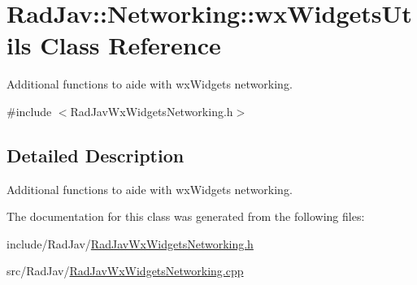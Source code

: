 \hypertarget{class_rad_jav_1_1_networking_1_1wx_widgets_utils}{}\section{Rad\+Jav\+:\+:Networking\+:\+:wx\+Widgets\+Utils Class Reference}
\label{class_rad_jav_1_1_networking_1_1wx_widgets_utils}


Additional functions to aide with wx\+Widgets networking.  




{\ttfamily \#include $<$Rad\+Jav\+Wx\+Widgets\+Networking.\+h$>$}



\subsection{Detailed Description}
Additional functions to aide with wx\+Widgets networking. 

The documentation for this class was generated from the following files\+:\begin{DoxyCompactItemize}
\item 
include/\+Rad\+Jav/\hyperlink{_rad_jav_wx_widgets_networking_8h}{Rad\+Jav\+Wx\+Widgets\+Networking.\+h}\item 
src/\+Rad\+Jav/\hyperlink{_rad_jav_wx_widgets_networking_8cpp}{Rad\+Jav\+Wx\+Widgets\+Networking.\+cpp}\end{DoxyCompactItemize}
